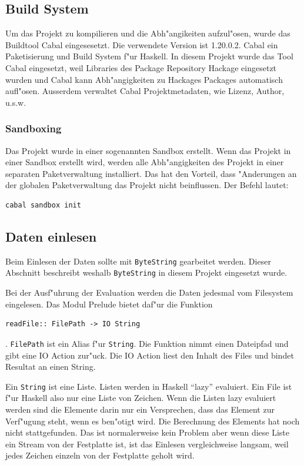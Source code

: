 \documentclass[a4paper, 12pt]{article}
\begin{document}
\subsection{Build System}
\label{sec:cabal}

Um das Projekt zu kompilieren und die Abh"angikeiten aufzul"osen, wurde das Buildtool Cabal eingesesetzt. Die verwendete Version ist 1.20.0.2. Cabal ein Paketisierung und Build System f"ur Haskell. In diesem Projekt wurde das Tool Cabal eingesetzt, weil Libraries des Package Repository Hackage eingesetzt wurden und Cabal kann Abh"angigkeiten zu Hackages Packages automatisch aufl"osen. Ausserdem verwaltet Cabal Projektmetadaten, wie Lizenz, Author, u.s.w.

\subsubsection{Sandboxing}
\label{sec:sanboxing}

Das Projekt wurde in einer sogenannten Sandbox erstellt. Wenn das Projekt in einer Sandbox erstellt wird, werden alle Abh"angigkeiten des Projekt in einer separaten Paketverwaltung installiert. Das hat den Vorteil, dass "Anderungen an der globalen Paketverwaltung das Projekt nicht beinflussen. Der Befehl lautet:
\begin{verbatim}
cabal sandbox init
\end{verbatim}

\subsection{Daten einlesen}
\label{sec:readio}

Beim Einlesen der Daten sollte mit \verb|ByteString| gearbeitet werden. Dieser Abschnitt beschreibt weshalb \verb|ByteString| in diesem Projekt eingesetzt wurde.

Bei der Ausf"uhrung der Evaluation werden die Daten jedesmal vom Filesystem eingelesen. Das Modul Prelude bietet daf"ur die Funktion
\begin{verbatim}
readFile:: FilePath -> IO String
\end{verbatim}
 . \verb|FilePath| ist ein Alias f"ur \verb|String|. Die Funktion nimmt einen Dateipfad und gibt eine IO Action zur"uck. Die IO Action liest den Inhalt des Files und bindet Resultat an einen String.

Ein \verb|String| ist eine Liste. Listen werden in Haskell ``lazy'' evaluiert. Ein File ist f"ur Haskell also nur eine Liste von Zeichen. Wenn die Listen lazy evaluiert werden sind die Elemente darin nur ein Versprechen, dass das Element zur Verf"ugung steht, wenn es ben"otigt wird. Die Berechnung des Elements hat noch nicht stattgefunden. Das ist normalerweise kein Problem aber wenn diese Liste ein Stream von der Festplatte ist, ist das Einlesen vergleichweise langsam, weil jedes Zeichen einzeln von der Festplatte geholt wird.
\end{document}
